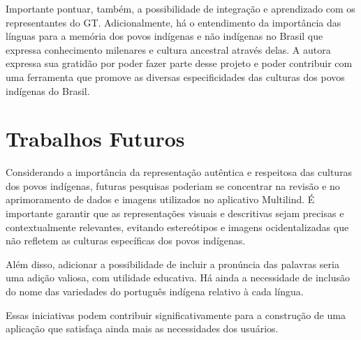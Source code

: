 Importante pontuar, também, a possibilidade de integração e aprendizado com os representantes do GT. Adicionalmente, há o entendimento da importância das línguas para a memória dos povos indígenas e não indígenas no Brasil que expressa 
conhecimento milenares e cultura ancestral através delas. A autora expressa sua gratidão por poder fazer parte desse projeto e poder contribuir com uma ferramenta que promove as diversas especificidades das culturas dos 
povos indígenas do Brasil. 

\section{Trabalhos Futuros}
\label{sec:Trabalhos Futuros}
Considerando a importância da representação autêntica e respeitosa das culturas dos povos indígenas, futuras pesquisas poderiam se concentrar na revisão e no aprimoramento de dados e imagens utilizados no aplicativo Multilind. É 
importante garantir que as representações visuais e descritivas sejam precisas e contextualmente relevantes, evitando estereótipos e imagens ocidentalizadas que não refletem as culturas específicas dos povos indígenas. 

Além disso, adicionar a possibilidade de incluir a pronúncia das palavras seria uma adição valiosa, com utilidade educativa. Há ainda a necessidade de inclusão do nome das variedades do português indígena relativo à cada língua.

Essas iniciativas podem contribuir significativamente para a construção de uma aplicação que satisfaça ainda mais as necessidades dos usuários.
